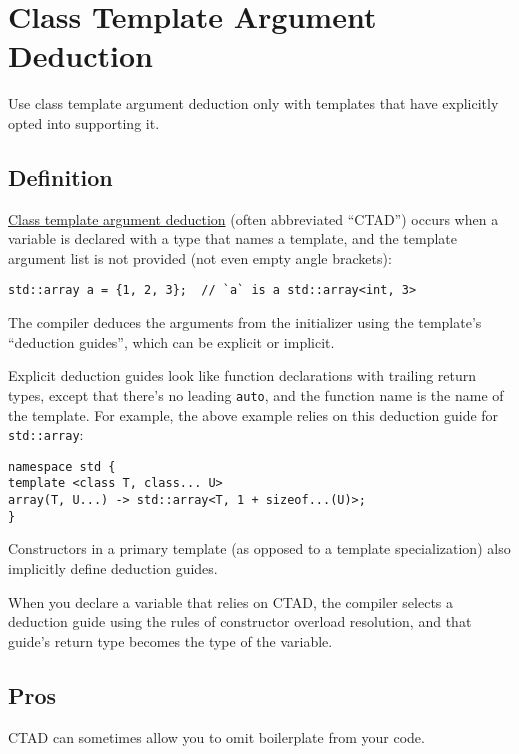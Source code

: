 
\section{Class Template Argument Deduction}\label{sec:class-template-argument-deduction}
Use class template argument deduction only with templates that have explicitly opted into supporting it.

\subsection{Definition}
\hyperref[sec:class-template-argument-deduction]{Class template argument deduction} (often abbreviated \enquote{CTAD}) occurs when a variable is declared with a type that names a template, and the template argument list is not provided (not even empty angle brackets):
\begin{verbatim}
std::array a = {1, 2, 3};  // `a` is a std::array<int, 3>
\end{verbatim}
The compiler deduces the arguments from the initializer using the template's \enquote{deduction guides}, which can be explicit or implicit.

Explicit deduction guides look like function declarations with trailing return types, except that there's no leading \texttt{auto}, and the function name is the name of the template. For example, the above example relies on this deduction guide for \texttt{std::array}:
\begin{verbatim}
namespace std {
template <class T, class... U>
array(T, U...) -> std::array<T, 1 + sizeof...(U)>;
}
\end{verbatim}
Constructors in a primary template (as opposed to a template specialization) also implicitly define deduction guides.

When you declare a variable that relies on CTAD, the compiler selects a deduction guide using the rules of constructor overload resolution, and that guide's return type becomes the type of the variable.

\subsection{Pros}
CTAD can sometimes allow you to omit boilerplate from your code.

